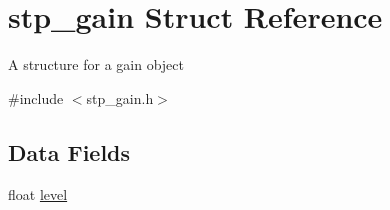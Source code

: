 \hypertarget{structstp__gain}{}\section{stp\+\_\+gain Struct Reference}
\label{structstp__gain}


A structure for a gain object ~\newline
  




{\ttfamily \#include $<$stp\+\_\+gain.\+h$>$}

\subsection*{Data Fields}
\begin{DoxyCompactItemize}
\item 
float \hyperlink{structstp__gain_a450c3ab9b94a4663caad892b7193b547}{level}
\end{DoxyCompactItemize}
